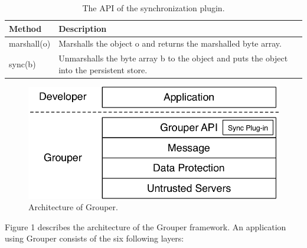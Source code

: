\documentclass[twocolumn,10pt]{article}
\begin{document}
\begin{table}[t]
	\centering
	\caption{The API of the synchronization plugin.}
	\label{my-label}
	\begin{tabular}{ll}
		\hline
		\textbf{Method} & \textbf{Description} \\ \hline
		marshall(o) & Marshalls the object o and returns the marshalled byte array. \\
		sync(b) & Unmarshalls the byte array b to the object and puts the object into the persistent store. \\ \hline
	\end{tabular}
\end{table}

\begin{figure}[t]
	\centering
	\includegraphics[scale=0.45]{architecture}
	\caption{Architecture of Grouper.}
\end{figure}

Figure 1 describes the architecture of the Grouper framework. 
An application using Grouper consists of the six following layers:
\end{document}
